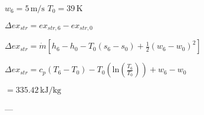 \( w_6 = 5 \, \text{m/s} \)  
\( T_0 = 39 \, \text{K} \)  

\( \Delta ex_{str} = ex_{str,6} - ex_{str,0} \)  

\( \Delta ex_{str} = \dot{m} \left[ h_6 - h_0 - T_0 (s_6 - s_0) + \frac{1}{2} (w_6 - w_0)^2 \right] \)  

\( \Delta ex_{str} = c_p (T_6 - T_0) - T_0 \left( \text{ln} \left( \frac{T_6}{T_0} \right) \right) + w_6 - w_0 \)  

\( = 335.42 \, \text{kJ/kg} \)  

---